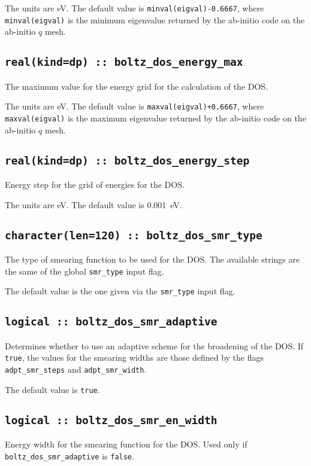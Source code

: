 The units are eV.
The default value is {\tt minval(eigval)-0.6667}, where  {\tt minval(eigval)} is the minimum eigenvalue returned by the ab-initio code on the ab-initio $q$ mesh.

\subsection[boltz\_dos\_energy\_max]{\tt real(kind=dp) :: boltz\_dos\_energy\_max}
The maximum value for the energy grid for the calculation of the DOS.

The units are eV.
The default value is {\tt maxval(eigval)+0.6667}, where  {\tt maxval(eigval)} is the maximum eigenvalue returned by the ab-initio code on the ab-initio $q$ mesh.

\subsection[boltz\_dos\_energy\_step]{\tt real(kind=dp) :: boltz\_dos\_energy\_step}
Energy step for the grid of energies for the DOS.

The units are eV.
The default value is 0.001~eV.

\subsection[boltz\_dos\_smr\_type]{\tt character(len=120) :: boltz\_dos\_smr\_type}
The type of smearing function to be used for the DOS. The available strings are the same of the global {\tt smr\_type} input flag. 

The default value is the one given via the {\tt smr\_type} input flag. 


\subsection[boltz\_dos\_smr\_adaptive]{\tt logical :: boltz\_dos\_smr\_adaptive}
Determines whether to use an adaptive scheme for the broadening of the DOS. If \verb#true#, the values for the smearing widths are those defined by the flags {\tt adpt\_smr\_steps} and {\tt adpt\_smr\_width}.

The default value is \verb#true#.

\subsection[boltz\_dos\_smr\_en\_width]{\tt logical :: boltz\_dos\_smr\_en\_width}
Energy width for the smearing function for the DOS. Used only if {\tt boltz\_dos\_smr\_adaptive} is \verb#false#.

